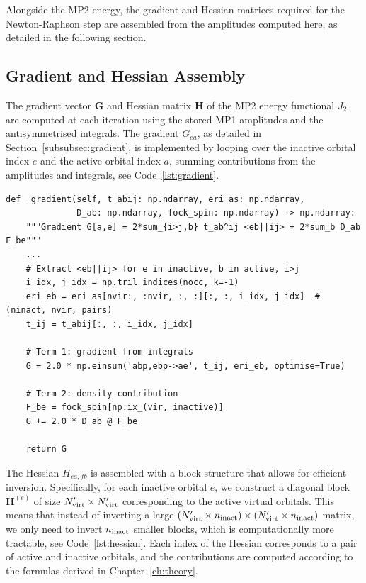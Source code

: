 Alongside the MP2 energy, the gradient and Hessian matrices required for the Newton-Raphson step are assembled from the amplitudes computed here, as detailed in the following section.


\subsection{Gradient and Hessian Assembly}

The gradient vector $\mathbf{G}$ and Hessian matrix $\mathbf{H}$ of the MP2 energy functional $J_2$ are computed at each iteration using the stored MP1 amplitudes and the antisymmetrised integrals. The gradient $G_{ea}$, as detailed in Section~\ref{subsubsec:gradient}, is implemented by looping over the inactive orbital index $e$ and the active orbital index $a$, summing contributions from the amplitudes and integrals, see Code~\ref{lst:gradient}. 

\begin{lstlisting}[style=python, caption={Gradient computation}, label=lst:gradient]
def _gradient(self, t_abij: np.ndarray, eri_as: np.ndarray,
              D_ab: np.ndarray, fock_spin: np.ndarray) -> np.ndarray:
    """Gradient G[a,e] = 2*sum_{i>j,b} t_ab^ij <eb||ij> + 2*sum_b D_ab F_be"""
    ...
    # Extract <eb||ij> for e in inactive, b in active, i>j
    i_idx, j_idx = np.tril_indices(nocc, k=-1)
    eri_eb = eri_as[nvir:, :nvir, :, :][:, :, i_idx, j_idx]  # (ninact, nvir, pairs)
    t_ij = t_abij[:, :, i_idx, j_idx]
    
    # Term 1: gradient from integrals
    G = 2.0 * np.einsum('abp,ebp->ae', t_ij, eri_eb, optimise=True)
    
    # Term 2: density contribution
    F_be = fock_spin[np.ix_(vir, inactive)]
    G += 2.0 * D_ab @ F_be
    
    return G
\end{lstlisting}

The Hessian $H_{ea,fb}$ is assembled with a block structure that allows for efficient inversion. Specifically, for each inactive orbital $e$, we construct a diagonal block $\mathbf{H}^{(e)}$ of size $N'_{\rm virt} \times N'_{\rm virt}$ corresponding to the active virtual orbitals. This means that instead of inverting a large $(N'_{\rm virt} \times n_{\rm inact}) \times (N'_{\rm virt} \times n_{\rm inact})$ matrix, we only need to invert $n_{\rm inact}$ smaller blocks, which is computationally more tractable, see Code~\ref{lst:hessian}. Each index of the Hessian corresponds to a pair of active and inactive orbitals, and the contributions are computed according to the formulas derived in Chapter~\ref{ch:theory}.

